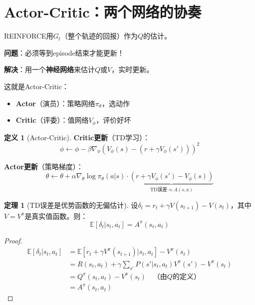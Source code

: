 \documentclass[11pt,a4paper]{article}
\theoremstyle{definition}
\newtheorem{definition}{定义}[section]
\newtheorem{theorem}{定理}[section]
\begin{document}
\section{Actor-Critic：两个网络的协奏}

\begin{plainwords}[REINFORCE的另一个问题]
REINFORCE用$G_t$（整个轨迹的回报）作为$Q$的估计。

\textbf{问题}：必须等到episode结束才能更新！

\textbf{解决}：用一个\textbf{神经网络}来估计$Q$或$V$，实时更新。

这就是Actor-Critic：
\begin{itemize}
    \item \textbf{Actor}（演员）：策略网络$\pi_\theta$，选动作
    \item \textbf{Critic}（评委）：值网络$V_\phi$，评价好坏
\end{itemize}
\end{plainwords}

\begin{definition}[Actor-Critic]
\textbf{Critic更新}（TD学习）：
\[
\phi \leftarrow \phi - \beta \nabla_\phi (V_\phi(s) - (r + \gamma V_\phi(s')))^2
\]

\textbf{Actor更新}（策略梯度）：
\[
\theta \leftarrow \theta + \alpha \nabla_\theta \log \pi_\theta(a|s) \cdot \underbrace{(r + \gamma V_\phi(s') - V_\phi(s))}_{\text{TD误差} \approx A(s,a)}
\]
\end{definition}

\begin{theorem}[TD误差是优势函数的无偏估计]
设$\delta_t = r_t + \gamma V(s_{t+1}) - V(s_t)$，其中$V = V^\pi$是真实值函数。则：
\[
\mathbb{E}[\delta_t | s_t, a_t] = A^\pi(s_t, a_t)
\]
\end{theorem}

\begin{proof}
\begin{align*}
\mathbb{E}[\delta_t | s_t, a_t] &= \mathbb{E}[r_t + \gamma V^\pi(s_{t+1}) | s_t, a_t] - V^\pi(s_t) \\
&= R(s_t, a_t) + \gamma \sum_{s'} P(s'|s_t, a_t) V^\pi(s') - V^\pi(s_t) \\
&= Q^\pi(s_t, a_t) - V^\pi(s_t) \quad \text{（由$Q$的定义）} \\
&= A^\pi(s_t, a_t)
\end{align*}
\end{proof}
\end{document}
